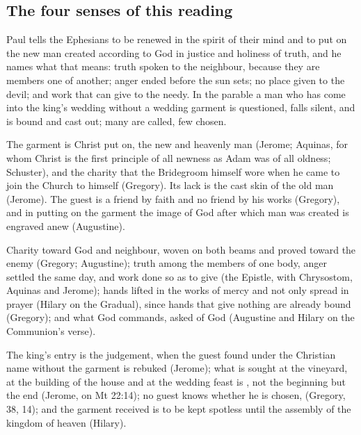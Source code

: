 \subsection{The four senses of this reading}

\begin{fourSenses}
\item[Literal.] Paul tells the Ephesians to be renewed in the spirit of their
mind and to put on the new man created according to God in justice and
holiness of truth, and he names what that means: truth spoken to the
neighbour, because they are members one of another; anger ended before the sun
sets; no place given to the devil; and work that can give to the needy. In the
parable a man who has come into the king's wedding without a wedding garment
is questioned, falls silent, and is bound and cast out; many are called, few
chosen.

\item[Allegorical.] The garment is Christ put on, the new and heavenly man
(Jerome; Aquinas, for whom Christ is the first principle of all newness as
Adam was of all oldness; Schuster), and the charity that the Bridegroom himself
wore when he came to join the Church to himself (Gregory). Its lack is the
cast skin of the old man (Jerome). The guest is a friend by faith and no friend
by his works (Gregory), and in putting on the garment the image of God after
which man was created is engraved anew (Augustine).

\item[Moral.] Charity toward God and neighbour, woven on both beams and proved
toward the enemy (Gregory; Augustine); truth among the members of one body,
anger settled the same day, and work done so as to give (the Epistle, with
Chrysostom, Aquinas and Jerome); hands lifted in the works of mercy and not
only spread in prayer (Hilary on the Gradual), since hands that give nothing
are already bound (Gregory); and what God commands, asked of God (Augustine and
Hilary on the Communion's verse).

\item[Anagogical.] The king's entry is the judgement, when the guest found under
the Christian name without the garment is rebuked (Jerome); what is sought at
the vineyard, at the building of the house and at the wedding feast is
, not the beginning but the end (Jerome, on
Mt 22:14); no guest knows whether he is chosen,  (Gregory,  38, 14); and the
garment received is to be kept spotless until the assembly of the kingdom of
heaven (Hilary).
\end{fourSenses}

